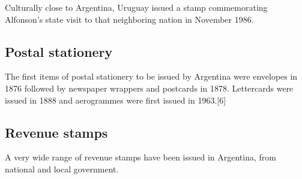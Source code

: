 Culturally close to Argentina, Uruguay issued a stamp commemorating Alfonson's state visit to that neighboring nation in November 1986.


\subsection{Postal stationery}

The first items of postal stationery to be issued by Argentina were envelopes in 1876 followed by newspaper wrappers and postcards in 1878. Lettercards were issued in 1888 and aerogrammes were first issued in 1963.[6]



\subsection{Revenue stamps}

A very wide range of revenue stamps have been issued in Argentina, from national and local government.









                      